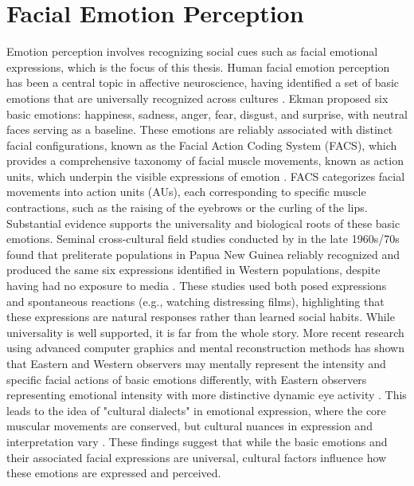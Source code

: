 \section{Facial Emotion Perception}
Emotion perception involves recognizing social cues such as facial emotional expressions, which is the focus of this thesis.
Human facial emotion perception has been a central topic in affective neuroscience, having identified a set of basic emotions that are universally recognized across cultures \citep{ekman1971constants}. 
Ekman proposed six basic emotions: happiness, sadness, anger, fear, disgust, and surprise, with neutral faces serving as a baseline. 
These emotions are reliably associated with distinct facial configurations, known as the Facial Action Coding System (FACS), which provides a comprehensive taxonomy of facial muscle movements, known as action units, which underpin the visible expressions of emotion \citep{ekman1978facial}. 
FACS categorizes facial movements into action units (AUs), each corresponding to specific muscle contractions, such as the raising of the eyebrows or the curling of the lips.
Substantial evidence supports the universality and biological roots of these basic emotions. 
Seminal cross-cultural field studies conducted by in the late 1960s/70s found that preliterate populations in Papua New Guinea reliably recognized and produced the same six expressions identified in Western populations, despite having had no exposure to media \citep{matsumoto_half-century_2022}. 
These studies used both posed expressions and spontaneous reactions (e.g., watching distressing films), highlighting that these expressions are natural responses rather than learned social habits. 
While universality is well supported, it is far from the whole story.
More recent research using advanced computer graphics and mental reconstruction methods has shown that Eastern and Western observers may mentally represent the intensity and specific facial actions of basic emotions differently, with Eastern observers representing emotional intensity with more distinctive dynamic eye activity \citep{jack_facial_2012}. 
This leads to the idea of "cultural dialects" in emotional expression, where the core muscular movements are conserved, but cultural nuances in expression and interpretation vary \citep{ruttkay_cultural_2009}. 
These findings suggest that while the basic emotions and their associated facial expressions are universal, cultural factors influence how these emotions are expressed and perceived.

